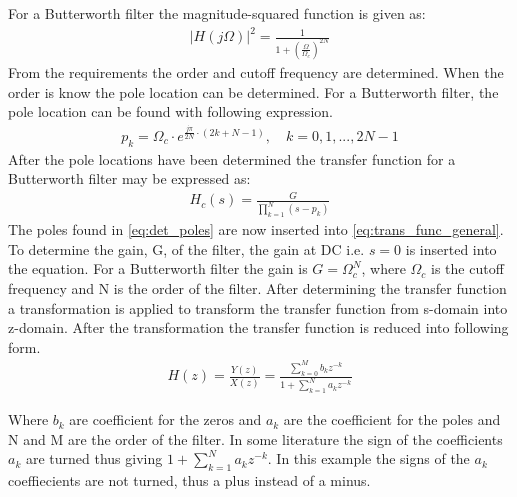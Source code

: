 For a Butterworth filter the magnitude-squared function is given as:
\begin{align}
|H(j\Omega)|^2 = \frac{1}{1+(\frac{\Omega}{\Omega_c})^{2N}}
\label{eq:mag_sq}
\end{align}
From the requirements the order and cutoff frequency are determined. When the order is know the pole location can be determined. For a Butterworth filter, the pole location can be found with following expression.
\begin{align}
p_k = \Omega_c \cdot e^{\frac{j\pi}{2N}\cdot (2k+N-1)}, \quad k=0,1, ..., 2N-1
\label{eq:det_poles}
\end{align}
After the pole locations have been determined the transfer function for a Butterworth filter may be expressed as:
\begin{align}
H_c(s) = \frac{G}{\prod\limits_{k=1}^{N}(s-p_k)} 
\label{eq:trans_func_general}
\end{align}
The poles found in \autoref{eq:det_poles} are now inserted into \autoref{eq:trans_func_general}. To determine the gain, G, of the filter, the gain at DC i.e. $s=0$ is inserted into the equation. For a Butterworth filter the gain is $G=\Omega_c^N$, where $\Omega_c$ is the cutoff frequency and N is the order of the filter. After determining the transfer function a transformation is applied to transform the transfer function from s-domain into z-domain. After the transformation the transfer function is reduced into following form.
\begin{align}
H(z) = \frac{Y(z)}{X(z)} = \frac{\sum\limits_{k=0}^{M}b_kz^{-k}}{1 + \sum\limits_{k=1}^{N}a_kz^{-k}} 
\label{eq:trans_standard}
\end{align}

Where $b_k$ are coefficient for the zeros and $a_k$ are the coefficient for the poles and N and M are the order of the filter. In some literature the sign of the  coefficients $a_k$ are turned thus giving $1 + \sum\limits_{k=1}^{N}a_kz^{-k}$. In this example the signs of the $a_k$ coeffiecients are not turned, thus a plus instead of a minus.

